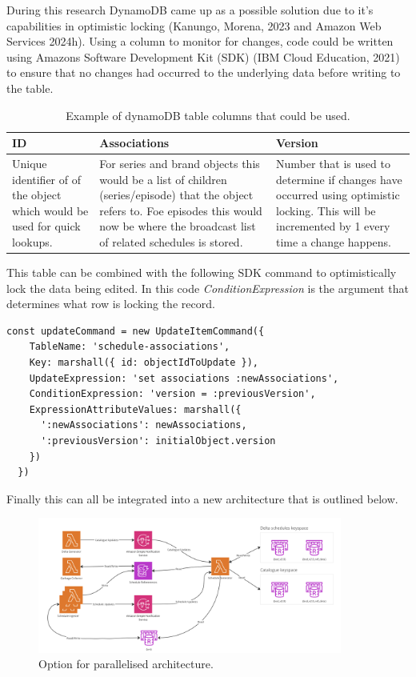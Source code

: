 During this research DynamoDB came up as a possible solution due to it's capabilities in optimistic locking 
(Kanungo, Morena, 2023 and Amazon Web Services 2024h). Using a column to monitor for changes, code could be written using Amazons Software Development
Kit (SDK) (IBM Cloud Education, 2021) to ensure that no changes had occurred to the underlying data before writing to the table. 

\begin{table}[H]
  \centering
  \begin{tabular}{|p{}|p{}|p{}|}
    \hline
    ID & Associations & Version \\ \hline
    Unique identifier of of the object which would be used for quick lookups. 
    & For series and brand objects this would be a list of children (series/episode) that the object refers to. Foe episodes this would now be 
    where the broadcast list of related schedules is stored.
    & Number that is used to determine if changes have occurred using optimistic locking. This will be incremented by 1 every time a change happens. \\ \hline
  \end{tabular}
  \caption{Example of dynamoDB table columns that could be used.}
\end{table}

This table can be combined with the following SDK command to optimistically lock the data being edited. In this code \emph{ConditionExpression} is 
the argument that determines what row is locking the record.

\begin{lstlisting}[caption=SDK command sent to optimistically lock writes to the assocaitions column.]
  const updateCommand = new UpdateItemCommand({
    TableName: 'schedule-associations',
    Key: marshall({ id: objectIdToUpdate }),
    UpdateExpression: 'set associations :newAssociations',
    ConditionExpression: 'version = :previousVersion',
    ExpressionAttributeValues: marshall({ 
      ':newAssociations': newAssociations,
      ':previousVersion': initialObject.version 
    })
  })
  \end{lstlisting}

  Finally this can all be integrated into a new architecture that is outlined below.

  \begin{figure}[H]
    \centering
    \includegraphics[width=10cm]{assets/architectures/dynamo.png}
    \caption{Option for parallelised architecture.}
    \label{fig:dynamoArchitecture}
  \end{figure}

